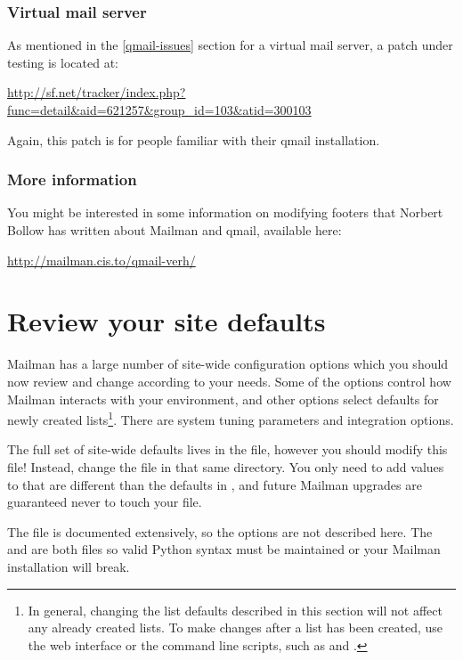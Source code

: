 \documentclass{howto}
\begin{document}
\subsubsection{Virtual mail server}

As mentioned in the \ref{qmail-issues} section for a virtual mail server, a
patch under testing is located at:

\url{http://sf.net/tracker/index.php?func=detail\&aid=621257\&group_id=103\&atid=300103}

Again, this patch is for people familiar with their qmail installation.

\subsubsection{More information}

You might be interested in some information on modifying footers that Norbert
Bollow has written about Mailman and qmail, available here:

    \url{http://mailman.cis.to/qmail-verh/}

\section{Review your site defaults\label{customizing}}

Mailman has a large number of site-wide configuration options which you should
now review and change according to your needs.  Some of the options control
how Mailman interacts with your environment, and other options select defaults
for newly created lists\footnote{In general, changing the list defaults
described in this section will not affect any already created lists.  To make
changes after a list has been created, use the web interface or the command
line scripts, such as  and .}.
There are system tuning parameters and integration options.

The full set of site-wide defaults lives in the
 file, however you should
 modify this file!  Instead, change the  file in
that same directory.  You only need to add values to  that are
different than the defaults in , and future Mailman upgrades
are guaranteed never to touch your  file.

The  file is documented extensively, so the options are not
described here.  The  and  are both
 files so valid Python syntax must be
maintained or your Mailman installation will break.
\end{document}
